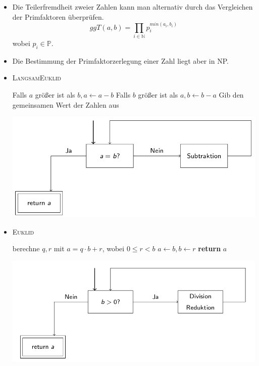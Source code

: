 \documentclass[12pt]{article}
\begin{document}
\begin{itemize}
	\item Die Teilerfremdheit zweier Zahlen kann man alternativ durch das Vergleichen der Primfaktoren \"uberpr\"ufen.
	$$ggT(a,b) = \prod_{i \in \mathbb{N}} p_{i}^{min(a_i,b_i)}$$ wobei $p_{i} \in \mathbb{P}$.
	\item Die Bestimmung der Primfaktorzerlegung einer Zahl liegt aber in NP.
	\item \textsc{LangsamEuklid}\\\begin{algorithmic}[1]
	\State Falls $a$ gr\"o{\ss}er ist als $b, a\gets a-b$
	\State Falls $b$ gr\"o{\ss}er ist als $a, b\gets b-a$
\EndWhile
	\State Gib den gemeinsamen Wert der Zahlen aus
\end{algorithmic}
\vspace{10pt}
\begin{center}
\includegraphics[scale=0.4]{langsamEuklid}
\end{center}
\newpage
	\item \textsc{Euklid} \\ \begin{algorithmic}[1]
		\State berechne $q,r$ mit $a=q\cdot b+r$, wobei $0\leq r < b$
		\State $a\gets b, b\gets r$
		\EndWhile
		\State \textbf{return} $a$
	\end{algorithmic}	
	\begin{center}
	\includegraphics[scale=0.4]{euklid}
	\end{center}

\end{itemize}
\end{document}
